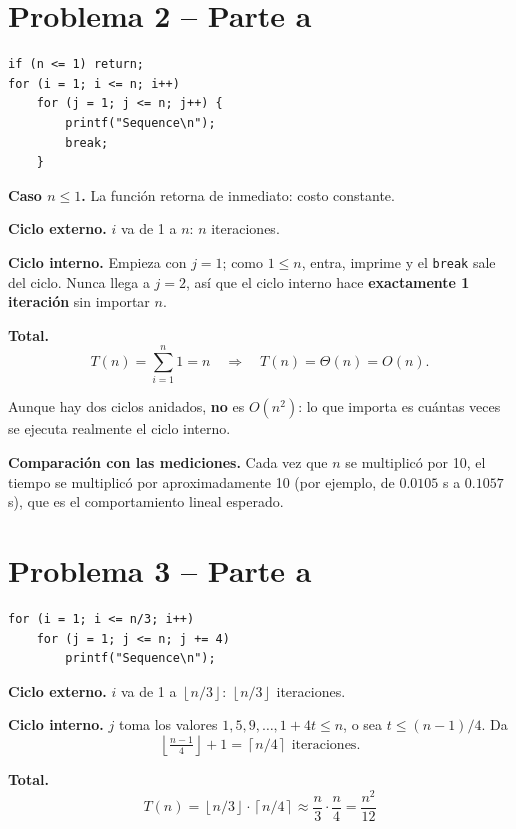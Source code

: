 \documentclass[11pt]{article}
\newcommand{\floor}[1]{\left\lfloor #1 \right\rfloor}
\newcommand{\ceil}[1]{\left\lceil #1 \right\rceil}
\begin{document}
\section*{Problema 2 -- Parte a}

\begin{verbatim}
if (n <= 1) return;
for (i = 1; i <= n; i++)
    for (j = 1; j <= n; j++) {
        printf("Sequence\n");
        break;
    }
\end{verbatim}

\textbf{Caso $n \le 1$.} La función retorna de inmediato: costo constante.

\textbf{Ciclo externo.} $i$ va de 1 a $n$: $n$ iteraciones.

\textbf{Ciclo interno.} Empieza con $j = 1$; como $1 \le n$, entra, imprime y el \texttt{break} sale del ciclo. Nunca llega a $j = 2$, así que el ciclo interno hace \textbf{exactamente 1 iteración} sin importar $n$.

\textbf{Total.}
\[
T(n) = \sum_{i=1}^{n} 1 = n \quad\Rightarrow\quad \boxed{T(n) = \Theta(n)} = O(n).
\]

Aunque hay dos ciclos anidados, \textbf{no} es $O(n^2)$: lo que importa es cuántas veces se ejecuta realmente el ciclo interno.

\textbf{Comparación con las mediciones.} Cada vez que $n$ se multiplicó por 10, el tiempo se multiplicó por aproximadamente 10 (por ejemplo, de $0.0105$ s a $0.1057$ s), que es el comportamiento lineal esperado.

\section*{Problema 3 -- Parte a}

\begin{verbatim}
for (i = 1; i <= n/3; i++)
    for (j = 1; j <= n; j += 4)
        printf("Sequence\n");
\end{verbatim}

\textbf{Ciclo externo.} $i$ va de 1 a $\floor{n/3}$: $\floor{n/3}$ iteraciones.

\textbf{Ciclo interno.} $j$ toma los valores $1, 5, 9, \dots, 1+4t \le n$, o sea $t \le (n-1)/4$. Da
\[
\floor{\tfrac{n-1}{4}} + 1 = \ceil{n/4} \text{ iteraciones.}
\]

\textbf{Total.}
\[
T(n) = \floor{n/3}\cdot\ceil{n/4} \approx \frac{n}{3}\cdot\frac{n}{4} = \frac{n^2}{12}
\]
\end{document}
